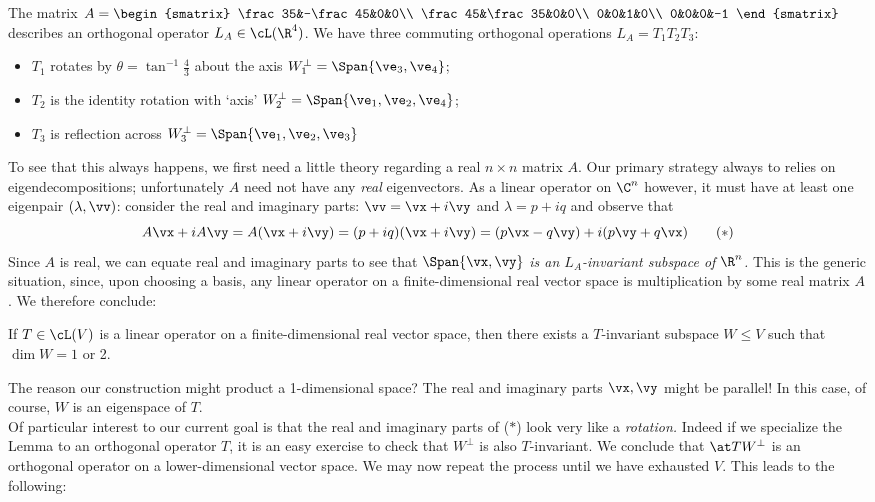 \begin{example}{}{}
The matrix $A=\begin{smatrix}
\frac 35&-\frac 45&0&0\\
\frac 45&\frac 35&0&0\\
0&0&1&0\\
0&0&0&-1
\end{smatrix}$ describes an orthogonal operator $L_A\in\cL(\R^4)$. We have three commuting orthogonal operations $L_A=T_1T_2T_3$:
\begin{itemize}
  \item $T_1$ rotates by $\theta=\tan^{-1}\frac 43$ about the axis $W_1^\perp=\Span\{\ve_3,\ve_4\}$;
  \item $T_2$ is the identity rotation with `axis' $W_2^\perp=\Span\{\ve_1,\ve_2,\ve_4\}$;
  \item $T_3$ is reflection across $W_3^\perp=\Span\{\ve_1,\ve_2,\ve_3\}$
\end{itemize}
\end{example}

To see that this always happens, we first need a little theory regarding a real $n\times n$ matrix $A$. Our primary strategy always to relies on eigendecompositions; unfortunately $A$ need not have any \emph{real} eigenvectors. As a linear operator on $\C^n$ however, it must have at least one eigenpair $(\lambda,\vv)$: consider the real and imaginary parts: $\vv=\vx+i\vy$ and $\lambda=p+iq$ and observe that
\[A\vx+iA\vy=A(\vx+i\vy)=(p+iq)(\vx+i\vy)=(p\vx-q\vy)+i(p\vy+q\vx) \tag{$\ast$}\]
Since $A$ is real, we can equate real and imaginary parts to see that $\Span\{\vx,\vy\}$ \emph{is an $L_A$-invariant subspace of $\R^n$.} This is the generic situation, since, upon choosing a basis, any linear operator on a finite-dimensional real vector space is multiplication by some real matrix $A$. We therefore conclude:

\begin{lemm}{}{}
If $T\in\cL(V)$ is a linear operator on a finite-dimensional real vector space, then there exists a $T$-invariant subspace $W\le V$ such that $\dim W=1$ or 2.
\end{lemm}

The reason our construction might product a 1-dimensional space? The real and imaginary parts $\vx,\vy$ might be parallel! In this case, of course, $W$ is an eigenspace of $T$.\\

Of particular interest to our current goal is that the real and imaginary parts of ($\ast$) look very like a \emph{rotation.} Indeed if we specialize the Lemma to an orthogonal operator $T$, it is an easy exercise to check that $W^\perp$ is also $T$-invariant. We conclude that $\at T{W^\perp}$ is an orthogonal operator on a lower-dimensional vector space. We may now repeat the process until we have exhausted $V$. This leads to the following:


